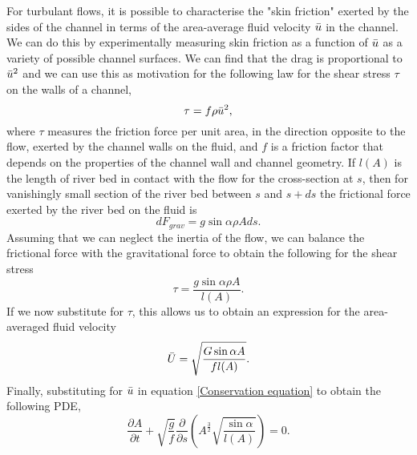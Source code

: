 \documentclass[12pt]{article}
\begin{document}
For turbulant flows, it is possible to characterise the "skin friction" exerted by the sides of the channel in terms of the area-average fluid velocity $\Bar{u}$ in the channel.  We can do this by experimentally measuring skin friction as a function of $\Bar{u}$ as a variety of possible channel surfaces.  We can find that the drag is proportional to $\Bar{u}^2$ and we can use this as motivation for the following law for the shear stress $\tau$ on the walls of a channel,
\begin{equation}
    \tau = f\rho \Bar{u}^2,
\end{equation}
where $\tau$ measures the friction force per unit area, in the direction opposite to the flow, exerted by the channel walls on the fluid, and $f$ is a friction factor that depends on the properties of the channel wall and channel geometry.  If $l(A)$ is the length of river bed in contact with the flow for the cross-section at $s$, then for vanishingly small section of the river bed between $s$ and $s+ds$ the frictional force exerted by the river bed on the fluid is
\begin{equation}
    dF_{grav} = g\sin\alpha \rho Ads.
\end{equation}
Assuming that we can neglect the inertia of the flow, we can balance the frictional force with the gravitational force to obtain the following for the shear stress
\begin{equation}
    \tau = \frac{g\sin\alpha\rho A}{l(A)}.
\end{equation}
If we now substitute for $\tau$, this allows us to obtain an expression for the area-averaged fluid velocity
\begin{equation}
    \Bar{U} = \sqrt{\frac{G\sin\alpha A}{fl(A)}}.
\end{equation}
Finally, substituting for $\Bar{u}$ in equation \ref{Conservation equation} to obtain the following PDE,
\begin{equation}\label{PDE}
    \frac{\partial A}{\partial t} + \sqrt{\frac{g}{f}}\frac{\partial}{\partial s}\left(A^{\frac{3}{2}}\sqrt{\frac{\sin\alpha}{l(A)}}\right) = 0.
\end{equation}
\end{document}
